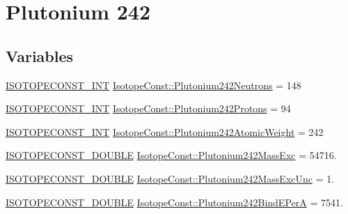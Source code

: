 \hypertarget{group___isotope_const-_plutonium-_pu242}{}\section{Plutonium 242}
\label{group___isotope_const-_plutonium-_pu242}
\subsection*{Variables}
\begin{DoxyCompactItemize}
\item 
\mbox{\hyperlink{group___isotope_const-_macros_ga5f18360b3e99483a35c32d789e62621c}{I\+S\+O\+T\+O\+P\+E\+C\+O\+N\+S\+T\+\_\+\+I\+NT}} \mbox{\hyperlink{group___isotope_const-_plutonium-_pu242_ga83738751aabd5ee43856301e6e84a7db}{Isotope\+Const\+::\+Plutonium242\+Neutrons}} = 148
\item 
\mbox{\hyperlink{group___isotope_const-_macros_ga5f18360b3e99483a35c32d789e62621c}{I\+S\+O\+T\+O\+P\+E\+C\+O\+N\+S\+T\+\_\+\+I\+NT}} \mbox{\hyperlink{group___isotope_const-_plutonium-_pu242_ga4ea7e53d55a009819411747c8e2119ea}{Isotope\+Const\+::\+Plutonium242\+Protons}} = 94
\item 
\mbox{\hyperlink{group___isotope_const-_macros_ga5f18360b3e99483a35c32d789e62621c}{I\+S\+O\+T\+O\+P\+E\+C\+O\+N\+S\+T\+\_\+\+I\+NT}} \mbox{\hyperlink{group___isotope_const-_plutonium-_pu242_gacffcd8f766d79fae9f60aedb0a076489}{Isotope\+Const\+::\+Plutonium242\+Atomic\+Weight}} = 242
\item 
\mbox{\hyperlink{group___isotope_const-_macros_ga8f45a7272ce02c0b4c65c44636ed719a}{I\+S\+O\+T\+O\+P\+E\+C\+O\+N\+S\+T\+\_\+\+D\+O\+U\+B\+LE}} \mbox{\hyperlink{group___isotope_const-_plutonium-_pu242_ga1dbc86d0512277168fae4b5d8c3d4d01}{Isotope\+Const\+::\+Plutonium242\+Mass\+Exc}} = 54716.
\item 
\mbox{\hyperlink{group___isotope_const-_macros_ga8f45a7272ce02c0b4c65c44636ed719a}{I\+S\+O\+T\+O\+P\+E\+C\+O\+N\+S\+T\+\_\+\+D\+O\+U\+B\+LE}} \mbox{\hyperlink{group___isotope_const-_plutonium-_pu242_ga4dba7cbea210b0bceedb6acafc7f11b4}{Isotope\+Const\+::\+Plutonium242\+Mass\+Exc\+Unc}} = 1.
\item 
\mbox{\hyperlink{group___isotope_const-_macros_ga8f45a7272ce02c0b4c65c44636ed719a}{I\+S\+O\+T\+O\+P\+E\+C\+O\+N\+S\+T\+\_\+\+D\+O\+U\+B\+LE}} \mbox{\hyperlink{group___isotope_const-_plutonium-_pu242_gaec04d47751c1f59c7e2289a125499cee}{Isotope\+Const\+::\+Plutonium242\+Bind\+E\+PerA}} = 7541.
\item 

\end{DoxyCompactItemize}
